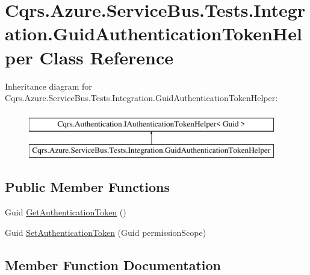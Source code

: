 \hypertarget{classCqrs_1_1Azure_1_1ServiceBus_1_1Tests_1_1Integration_1_1GuidAuthenticationTokenHelper}{}\section{Cqrs.\+Azure.\+Service\+Bus.\+Tests.\+Integration.\+Guid\+Authentication\+Token\+Helper Class Reference}
\label{classCqrs_1_1Azure_1_1ServiceBus_1_1Tests_1_1Integration_1_1GuidAuthenticationTokenHelper}
Inheritance diagram for Cqrs.\+Azure.\+Service\+Bus.\+Tests.\+Integration.\+Guid\+Authentication\+Token\+Helper\+:\begin{figure}[H]
\begin{center}
\leavevmode
\includegraphics[height=2.000000cm]{classCqrs_1_1Azure_1_1ServiceBus_1_1Tests_1_1Integration_1_1GuidAuthenticationTokenHelper}
\end{center}
\end{figure}
\subsection*{Public Member Functions}
\begin{DoxyCompactItemize}
\item 
Guid \hyperlink{classCqrs_1_1Azure_1_1ServiceBus_1_1Tests_1_1Integration_1_1GuidAuthenticationTokenHelper_abf0d4aa030e3cc15830301225ef28eac_abf0d4aa030e3cc15830301225ef28eac}{Get\+Authentication\+Token} ()
\item 
Guid \hyperlink{classCqrs_1_1Azure_1_1ServiceBus_1_1Tests_1_1Integration_1_1GuidAuthenticationTokenHelper_a651700262491c8cf527e3a3881198050_a651700262491c8cf527e3a3881198050}{Set\+Authentication\+Token} (Guid permission\+Scope)
\end{DoxyCompactItemize}


\subsection{Member Function Documentation}
\mbox{\label{classCqrs_1_1Azure_1_1ServiceBus_1_1Tests_1_1Integration_1_1GuidAuthenticationTokenHelper_abf0d4aa030e3cc15830301225ef28eac_abf0d4aa030e3cc15830301225ef28eac}} 
